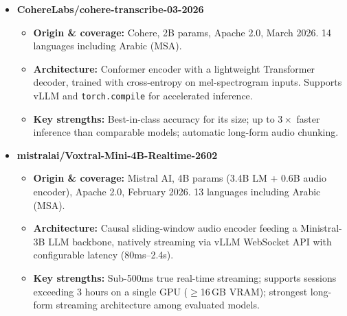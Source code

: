 \documentclass[12pt,a4paper]{report}
\begin{document}
\begin{itemize}

  \item \textbf{CohereLabs/cohere-transcribe-03-2026}
  \begin{itemize}
    \item \textbf{Origin \& coverage:} Cohere, 2B params, Apache 2.0, March 2026.
    14 languages including Arabic (MSA).
    \item \textbf{Architecture:} Conformer encoder with a lightweight Transformer decoder,
    trained with cross-entropy on mel-spectrogram inputs. Supports vLLM and
    \texttt{torch.compile} for accelerated inference.
    \item \textbf{Key strengths:} Best-in-class accuracy for its size; up to $3\times$ faster
    inference than comparable models; automatic long-form audio chunking.
  \end{itemize}

  \item \textbf{mistralai/Voxtral-Mini-4B-Realtime-2602}
  \begin{itemize}
    \item \textbf{Origin \& coverage:} Mistral AI, 4B params (3.4B LM + 0.6B audio encoder),
    Apache 2.0, February 2026. 13 languages including Arabic (MSA).
    \item \textbf{Architecture:} Causal sliding-window audio encoder feeding a Ministral-3B
    LLM backbone, natively streaming via vLLM WebSocket API with configurable latency
    (80ms--2.4s).
    \item \textbf{Key strengths:} Sub-500ms true real-time streaming; supports sessions
    exceeding 3 hours on a single GPU ($\geq$16\,GB VRAM); strongest long-form streaming
    architecture among evaluated models.
  \end{itemize}


\end{itemize}
\end{document}
